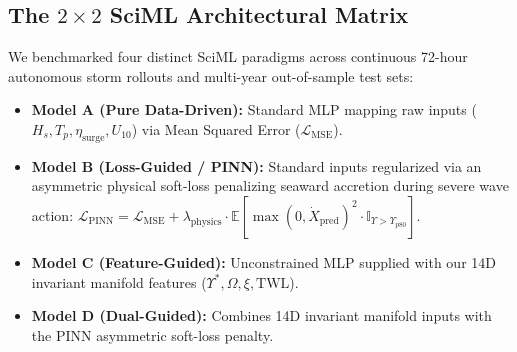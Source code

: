 \documentclass[journal]{IEEEtran}
\begin{document}
\subsection{The \texorpdfstring{$2 \times 2$}{2x2} SciML Architectural Matrix}
We benchmarked four distinct SciML paradigms across continuous 72-hour autonomous storm rollouts and multi-year out-of-sample test sets:
\begin{itemize}
    \setlength{\itemsep}{0pt}\setlength{\parskip}{0pt}\setlength{\topsep}{1pt}
    \item \textbf{Model A (Pure Data-Driven):} Standard MLP mapping raw inputs ($H_s, T_p, \eta_{\text{surge}}, U_{10}$) via Mean Squared Error ($\mathcal{L}_{\text{MSE}}$).
    \item \textbf{Model B (Loss-Guided / PINN):} Standard inputs regularized via an asymmetric physical soft-loss penalizing seaward accretion during severe wave action: $\mathcal{L}_{\text{PINN}} = \mathcal{L}_{\text{MSE}} + \lambda_{\text{physics}} \cdot \mathbb{E}\left[\max(0, \dot{X}_{\text{pred}})^2 \cdot \mathbb{I}_{\Upsilon > \Upsilon_{p80}}\right]$.
    \item \textbf{Model C (Feature-Guided):} Unconstrained MLP supplied with our 14D invariant manifold features ($\Upsilon^*, \Omega, \xi, \text{TWL}$).
    \item \textbf{Model D (Dual-Guided):} Combines 14D invariant manifold inputs with the PINN asymmetric soft-loss penalty.
\end{itemize}

\begin{table}[htbp]
\caption{SCIML ARCHITECTURAL MATRIX PERFORMANCE: DYNAMIC 72-HOUR STORM ROLLOUT \& MULTI-YEAR TEST SET}
\label{tab:sciml_matrix}
\centering
{}
\end{table}
\end{document}
